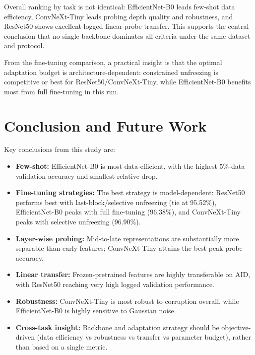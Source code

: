 \documentclass[11pt,a4paper]{article}
\begin{document}
Overall ranking by task is not identical: EfficientNet-B0 leads few-shot data efficiency, ConvNeXt-Tiny leads probing depth quality and robustness, and ResNet50 shows excellent logged linear-probe transfer. This supports the central conclusion that no single backbone dominates all criteria under the same dataset and protocol.

From the fine-tuning comparison, a practical insight is that the optimal adaptation budget is architecture-dependent: constrained unfreezing is competitive or best for ResNet50/ConvNeXt-Tiny, while EfficientNet-B0 benefits most from full fine-tuning in this run.

\section{Conclusion and Future Work}
Key conclusions from this study are:
\begin{itemize}
	\item \textbf{Few-shot:} EfficientNet-B0 is most data-efficient, with the highest $5\%$-data validation accuracy and smallest relative drop.
	\item \textbf{Fine-tuning strategies:} The best strategy is model-dependent: ResNet50 performs best with last-block/selective unfreezing (tie at 95.52\%), EfficientNet-B0 peaks with full fine-tuning (96.38\%), and ConvNeXt-Tiny peaks with selective unfreezing (96.90\%).
	\item \textbf{Layer-wise probing:} Mid-to-late representations are substantially more separable than early features; ConvNeXt-Tiny attains the best peak probe accuracy.
	\item \textbf{Linear transfer:} Frozen-pretrained features are highly transferable on AID, with ResNet50 reaching very high logged validation performance.
	\item \textbf{Robustness:} ConvNeXt-Tiny is most robust to corruption overall, while EfficientNet-B0 is highly sensitive to Gaussian noise.
	\item \textbf{Cross-task insight:} Backbone and adaptation strategy should be objective-driven (data efficiency vs robustness vs transfer vs parameter budget), rather than based on a single metric.
\end{itemize}
\end{document}
